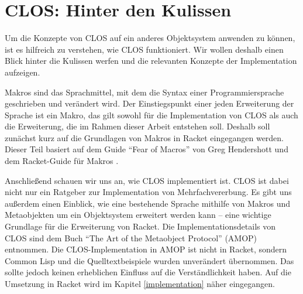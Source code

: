 
\pagestyle{diplHeadings}





\setcounter{page}{1}
\tableofcontents
\cleardoublepage 

\setcounter{page}{1} 
\mainmatter  
{}

 

 



\chapter{CLOS: Hinter den Kulissen}
Um die Konzepte von CLOS auf ein anderes Objektsystem anwenden zu können, ist es hilfreich zu verstehen, wie CLOS funktioniert. Wir wollen deshalb einen Blick hinter die Kulissen werfen und die relevanten Konzepte der Implementation aufzeigen.

Makros sind das Sprachmittel, mit dem die Syntax einer Programmiersprache geschrieben und verändert wird. Der Einstiegspunkt einer jeden Erweiterung der Sprache ist ein Makro, das gilt sowohl für die Implementation von CLOS als auch die Erweiterung, die im Rahmen dieser Arbeit entstehen soll. Deshalb soll zunächst kurz auf die Grundlagen von Makros in Racket eingegangen werden. Dieser Teil basiert auf dem Guide ``Fear of Macros'' von Greg Hendershott \cite{fearofmacros} und dem Racket-Guide für Makros \cite{racketguide-macros}. %

Anschließend schauen wir uns an, wie CLOS implementiert ist. CLOS ist dabei nicht nur ein Ratgeber zur Implementation von Mehrfachvererbung. Es gibt uns außerdem einen Einblick, wie eine bestehende Sprache mithilfe von Makros und Metaobjekten um ein Objektsystem erweitert werden kann -- eine wichtige Grundlage für die Erweiterung von Racket. Die Implementationsdetails von CLOS sind dem Buch ``The Art of the Metaobject Protocol'' (AMOP) \cite{amop} entnommen. Die CLOS-Implementation in AMOP ist nicht in Racket, sondern Common Lisp und die Quelltextbeispiele wurden unverändert übernommen. Das sollte jedoch keinen erheblichen Einfluss auf die Verständlichkeit haben. Auf die Umsetzung in Racket wird im Kapitel \ref{implementation} näher eingegangen.

